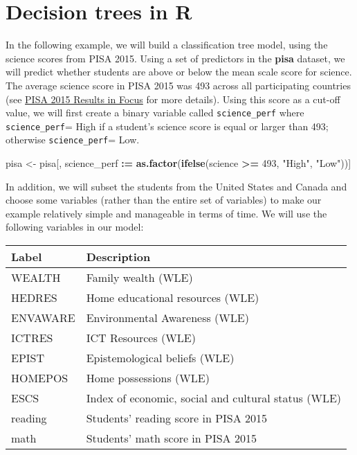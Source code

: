 \documentclass[]{book}
\newenvironment{Shaded}{\begin{snugshade}}{\end{snugshade}}
\newcommand{\DecValTok}[1]{\textcolor[rgb]{0.00,0.00,0.81}{#1}}
\newcommand{\ErrorTok}[1]{\textcolor[rgb]{0.64,0.00,0.00}{\textbf{#1}}}
\newcommand{\KeywordTok}[1]{\textcolor[rgb]{0.13,0.29,0.53}{\textbf{#1}}}
\newcommand{\NormalTok}[1]{#1}
\newcommand{\OperatorTok}[1]{\textcolor[rgb]{0.81,0.36,0.00}{\textbf{#1}}}
\newcommand{\StringTok}[1]{\textcolor[rgb]{0.31,0.60,0.02}{#1}}
\begin{document}
\hypertarget{decision-trees-in-r}{%
\section{Decision trees in R}\label{decision-trees-in-r}}

In the following example, we will build a classification tree model, using the science scores from PISA 2015. Using a set of predictors in the \textbf{pisa} dataset, we will predict whether students are above or below the mean scale score for science. The average science score in PISA 2015 was 493 across all participating countries (see \href{https://www.oecd.org/pisa/pisa-2015-results-in-focus.pdf}{PISA 2015 Results in Focus} for more details). Using this score as a cut-off value, we will first create a binary variable called \texttt{science\_perf} where \texttt{science\_perf}= High if a student's science score is equal or larger than 493; otherwise \texttt{science\_perf}= Low.

\begin{Shaded}
\begin{Highlighting}[]
\NormalTok{pisa <-}\StringTok{ }\NormalTok{pisa[, science_perf }\OperatorTok{:}\ErrorTok{=}\StringTok{ }\KeywordTok{as.factor}\NormalTok{(}\KeywordTok{ifelse}\NormalTok{(science }\OperatorTok{>=}\StringTok{ }\DecValTok{493}\NormalTok{, }\StringTok{"High"}\NormalTok{, }\StringTok{"Low"}\NormalTok{))]}
\end{Highlighting}
\end{Shaded}

In addition, we will subset the students from the United States and Canada and choose some variables (rather than the entire set of variables) to make our example relatively simple and manageable in terms of time. We will use the following variables in our model:

\begin{longtable}[]{@{}ll@{}}
\toprule
Label & Description\tabularnewline
\midrule
\endhead
WEALTH & Family wealth (WLE)\tabularnewline
HEDRES & Home educational resources (WLE)\tabularnewline
ENVAWARE & Environmental Awareness (WLE)\tabularnewline
ICTRES & ICT Resources (WLE)\tabularnewline
EPIST & Epistemological beliefs (WLE)\tabularnewline
HOMEPOS & Home possessions (WLE)\tabularnewline
ESCS & Index of economic, social and cultural status (WLE)\tabularnewline
reading & Students' reading score in PISA 2015\tabularnewline
math & Students' math score in PISA 2015\tabularnewline
\bottomrule
\end{longtable}
\end{document}
